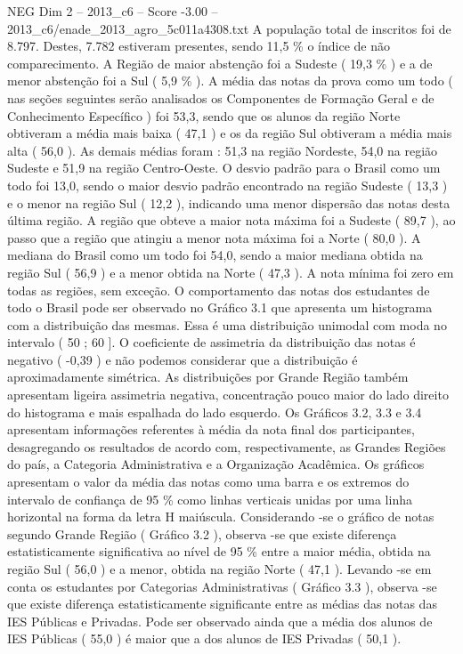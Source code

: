 \begin{textsample}{NEG Dim 2 – 2013\_c6 – Score -3.00 – 2013\_c6/enade\_2013\_agro\_5c011a4308.txt}
A população total de inscritos foi de 8.797.
Destes, 7.782 estiveram presentes, sendo 11,5 \% o índice de não comparecimento.
A Região de maior abstenção foi a Sudeste ( 19,3 \% ) e a de menor abstenção foi a Sul ( 5,9 \% ).
A média das notas da prova como um todo ( nas seções seguintes serão analisados os Componentes de Formação Geral e de Conhecimento Específico ) foi 53,3, sendo que os alunos da região Norte obtiveram a média mais baixa ( 47,1 ) e os da região Sul obtiveram a média mais alta ( 56,0 ).
As demais médias foram : 51,3 na região Nordeste, 54,0 na região Sudeste e 51,9 na região Centro-Oeste.
O desvio padrão para o Brasil como um todo foi 13,0, sendo o maior desvio padrão encontrado na região Sudeste ( 13,3 ) e o menor na região Sul ( 12,2 ), indicando uma menor dispersão das notas desta última região.
A região que obteve a maior nota máxima foi a Sudeste ( 89,7 ), ao passo que a região que atingiu a menor nota máxima foi a Norte ( 80,0 ).
A mediana do Brasil como um todo foi 54,0, sendo a maior mediana obtida na região Sul ( 56,9 ) e a menor obtida na Norte ( 47,3 ).
A nota mínima foi zero em todas as regiões, sem exceção.
O comportamento das notas dos estudantes de todo o Brasil pode ser observado no Gráfico 3.1 que apresenta um histograma com a distribuição das mesmas.
Essa é uma distribuição unimodal com moda no intervalo ( 50 ; 60 ].
O coeficiente de assimetria da distribuição das notas é negativo ( -0,39 ) e não podemos considerar que a distribuição é aproximadamente simétrica.
As distribuições por Grande Região também apresentam ligeira assimetria negativa, concentração pouco maior do lado direito do histograma e mais espalhada do lado esquerdo.
Os Gráficos 3.2, 3.3 e 3.4 apresentam informações referentes à média da nota final dos participantes, desagregando os resultados de acordo com, respectivamente, as Grandes Regiões do país, a Categoria Administrativa e a Organização Acadêmica.
Os gráficos apresentam o valor da média das notas como uma barra e os extremos do intervalo de confiança de 95 \% como linhas verticais unidas por uma linha horizontal na forma da letra H maiúscula.
Considerando -se o gráfico de notas segundo Grande Região ( Gráfico 3.2 ), observa -se que existe diferença estatisticamente significativa ao nível de 95 \% entre a maior média, obtida na região Sul ( 56,0 ) e a menor, obtida na região Norte ( 47,1 ).
Levando -se em conta os estudantes por Categorias Administrativas ( Gráfico 3.3 ), observa -se que existe diferença estatisticamente significante entre as médias das notas das IES Públicas e Privadas.
Pode ser observado ainda que a média dos alunos de IES Públicas ( 55,0 ) é maior que a dos alunos de IES Privadas ( 50,1 ).

\end{textsample}
